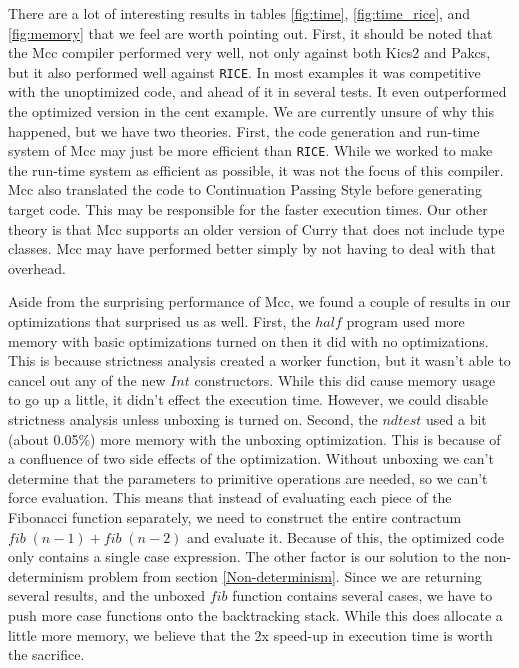\documentclass{book}
\newcommand{\rice}{\texttt{RICE}}
\theoremstyle{definition}
\newcommand{\Conid}[1]{\mathit{#1}}
\newcommand{\Varid}[1]{\mathit{#1}}
\begin{document}
There are a lot of interesting results in tables \ref{fig:time}, \ref{fig:time_rice}, and \ref{fig:memory}
that we feel are worth pointing out.
First, it should be noted that the Mcc compiler performed very well,
not only against both Kics2 and Pakcs, but it also performed well against \rice.
In most examples it was competitive with the unoptimized code, and ahead of it in several tests.
It even outperformed the optimized version in the cent example.
We are currently unsure of why this happened, but we have two theories.
First, the code generation and run-time system of Mcc may just be more efficient than \rice.
While we worked to make the run-time system as efficient as possible, 
it was not the focus of this compiler.
Mcc also translated the code to Continuation Passing Style \cite{continuationsAppel}
before generating target code.
This may be responsible for the faster execution times.
Our other theory is that Mcc supports an older version of Curry that does not include type classes.
Mcc may have performed better simply by not having to deal with that overhead.

Aside from the surprising performance of Mcc,
we found a couple of results in our optimizations that surprised us as well.
First, the \ensuremath{\Varid{half}} program used more memory with basic optimizations turned on
then it did with no optimizations.
This is because strictness analysis created a worker function, but it wasn't able to cancel
out any of the new \ensuremath{\Conid{Int}} constructors.
While this did cause memory usage to go up a little, it didn't effect the execution time.
However, we could disable strictness analysis unless unboxing is turned on.
Second, the \ensuremath{\Varid{ndtest}} used a bit (about 0.05\%) more memory with the unboxing optimization.
This is because of a confluence of two side effects of the optimization.
Without unboxing we can't determine that the parameters to primitive operations are
needed, so we can't force evaluation.
This means that instead of evaluating each piece of the Fibonacci function separately,
we need to construct the entire contractum \ensuremath{\Varid{fib}\;(\Varid{n}\mathbin{-}\mathrm{1})\mathbin{+}\Varid{fib}\;(\Varid{n}\mathbin{-}\mathrm{2})} and evaluate it.
Because of this, the optimized code only contains a single case expression.
The other factor is our solution to the non-determinism problem from section
\ref{Non-determinism}.
Since we are returning several results, and the unboxed \ensuremath{\Varid{fib}} function contains several cases,
we have to push more case functions onto the backtracking stack.
While this does allocate a little more memory, we believe that the 2x speed-up
in execution time is worth the sacrifice.
\end{document}

